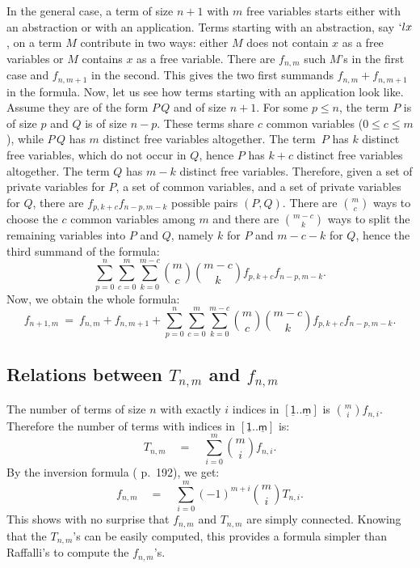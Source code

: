 \documentclass{jfp1}
\newcommand{\Var}[1]{\underline{\mathsf{#1}}}
\begin{document}
In the general case, a term of size $n+1$ with $m$ free variables starts either with
an abstraction or with an application. Terms starting with an abstraction, say $`l
x$, on a term $M$ contribute in two ways: either $M$ does not contain $x$ as a free
variables or $M$ contains $x$ as a free variable.  There are $f_{n,m}$ such $M$'s in
the first case and $f_{n,m+1}$ in the second.  This gives the two first summands
$f_{n,m}+f_{n,m+1}$ in the formula.  Now, let us see how terms starting with an
application look like.  Assume they are of the form $P\,Q$ and of size $n+1$.  For
some $p \leq n$, the term $P$ is of size $p$ and $Q$ is of size $n-p$.  These
terms share $c$ common variables ($0\le c \le m$), while $P\, Q$ has $m$ distinct
free variables altogether.  The term~$P$ has $k$ distinct free variables, which do not occur in $Q$,
hence $P$ has $k+c$ distinct free variables altogether.  The term $Q$ has $m-k$
distinct free variables.  Therefore, given a set of private variables for $P$, a set of
common variables, and a set of private variables for $Q$, there are $f_{p,k+c} f_{n-p,
  m-k}$ possible pairs $(P,Q)$.  There are ${m \choose c}$ ways to choose the $c$
common variables among $m$ and there are ${m-c \choose k}$ ways to split the
remaining variables into $P$ and $Q$, namely $k$ for $P$ and $m-c-k$ for $Q$, hence
the third summand of the formula:
\[\sum_{p=0}^{n} \sum_{c=0}^{m} \sum_{k=0}^{m - c} {m \choose c} {m - c\choose k} f_{p,k+c} f_{n-p,m-k}.\]
Now, we obtain the whole formula:
\begin{displaymath}
f_{n+1,m} \ =\ f_{n,m} + f_{n,m+1} + \sum_{p=0}^{n} \sum_{c=0}^{m} \sum_{k=0}^{m - c} {m \choose c} {m - c\choose k} f_{p,k+c} f_{n-p,m-k}.
\end{displaymath}

\subsection{Relations between $T_{n,m}$ and $f_{n,m}$}
\label{sec:relat-betw}

The number of terms of size $n$ with exactly $i$ indices in $[\Var{1}..\Var{m}]$ is
\({m \choose i} f_{n,i} .\)
Therefore the number of terms with indices in $[\Var{1}..\Var{m}]$ is:
\[T_{n,m} \quad = \quad \sum_{i=0}^{m} {m \choose i} f_{n,i}.\]
By the inversion formula (\cite{GraKnuPat} p.~192), we get:
\[f_{n,m} \quad = \quad \sum_{i=0}^m (-1)^{m+i} {m \choose i} T_{n,i}.\] This shows
with no surprise that $f_{n,m}$ and $T_{n,m}$ are simply connected.  Knowing
that the $T_{n,m}$'s can be easily computed, this provides a formula simpler than
Raffalli's to compute the $f_{n,m}$'s.
\end{document}
